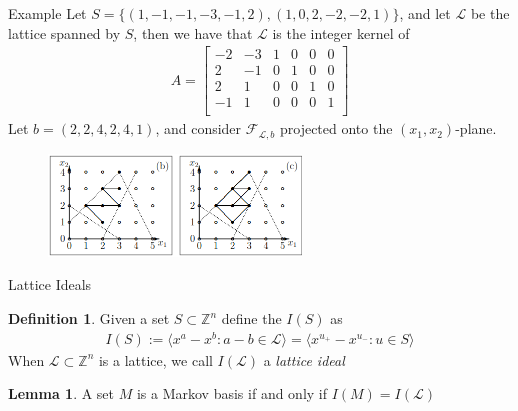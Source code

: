 \documentclass[9pt]{beamer}
\newcommand\F{\mathcal{F}}
\newcommand\set[1]{\{#1\}}
\newcommand\Z{\mathbb{Z}}
\theoremstyle{definition}
\newtheorem{lem}{Lemma}
\newtheorem{defn}{Definition}
\begin{document}
\begin{frame}[fragile]{Example}
  Let $S = \set{(1, -1, -1, -3, -1, 2), (1, 0, 2, -2, -2, 1)}$, and let $\mathcal{L}$
  be the lattice spanned by $S$, then we have that $\mathcal{L}$ is the integer kernel of
  \begin{align*}
    A =   \begin{bmatrix}
      -2 & -3 & 1 & 0 & 0 & 0\\
      2 & -1 & 0 & 1 & 0 & 0\\
      2 &  1& 0 & 0 & 1 & 0 \\
      -1 & 1 & 0 & 0 & 0 & 1 \\
    \end{bmatrix}
  \end{align*}
  Let $b = (2, 2, 4, 2, 4, 1)$, and consider $\F_{\mathcal{L}, b}$ projected onto the $(x_1, x_2)$-plane.
  \begin{figure}
    \includegraphics[width=0.6\textwidth, height=0.3\textheight]{images/example}
  \end{figure}

\end{frame}


\begin{frame}[fragile]{Lattice Ideals}
  \begin{defn}
    Given a set $S \subset \Z^n$ define the $I(S)$ as
    \begin{align*}
      I(S) := \langle x^a - x^b : a - b \in \mathcal{L} \rangle
      = \langle x^{u_+} - x^{u_-} : u \in S \rangle
    \end{align*}
    When $\mathcal{L} \subset \Z^n$ is a lattice, we call $I(\mathcal{L})$ a
    \emph{lattice ideal}
  \end{defn}
  \begin{lem}
    A set $M$ is a Markov basis if and only if $I(M) = I(\mathcal{L})$
  \end{lem}
\end{frame}
\end{document}
